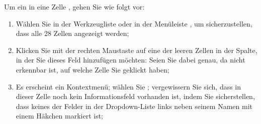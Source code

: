 Um ein  in eine Zelle , gehen Sie wie folgt vor:

\begin{enumerate}
	\item Wählen Sie in der Werkzeugliste  oder in der Menüleiste , um sicherzustellen, dass alle 28 Zellen angezeigt werden;
	\item Klicken Sie mit der rechten Maustaste auf eine der leeren Zellen in der Spalte, in der Sie dieses Feld hinzufügen möchten: Seien Sie dabei genau, da nicht erkennbar ist, auf welche Zelle Sie geklickt haben;
	\item Es erscheint ein Kontextmenü; wählen Sie ; vergewissern Sie sich, dass in dieser Zelle noch kein Informationsfeld vorhanden ist, indem Sie sicherstellen, dass keines der Felder in der Dropdown-Liste links neben seinem Namen mit einem Häkchen markiert ist;

\end{enumerate}
